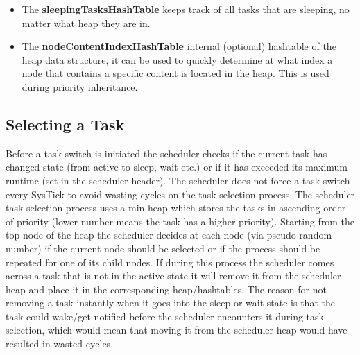 \documentclass[12pt,a4paper]{article}
\begin{document}
\begin{itemize}
  \item The  \textbf{sleepingTasksHashTable} keeps track of all tasks that are sleeping, no matter what heap they are in.
  \item The  \textbf{nodeContentIndexHashTable} internal (optional) hashtable of the heap data structure, it can be used to quickly determine at what index a node that contains a specific content is located in the heap. This is used during priority inheritance.
\end{itemize}




\subsection{Selecting a Task}
Before a task switch is initiated the scheduler checks if the current task has changed state (from active to sleep, wait etc.) or if it has exceeded its maximum runtime (set in the scheduler header). The scheduler does not force a task switch every SysTick to avoid wasting cycles on the task selection process. The scheduler task selection process uses a min heap which stores the tasks in ascending order of priority (lower number means the task has a higher priority). Starting from the top node of the heap the scheduler decides at each node (via pseudo random number) if the current node should be selected or if the process should be repeated for one of its child nodes. If during this process the scheduler comes across a task that is not in the active state it will remove it from the scheduler heap and place it in the corresponding heap/hashtables. The reason for not removing a task instantly when it goes into the sleep or wait state is that the task could wake/get notified before the scheduler encounters it during task selection, which would mean that moving it from the scheduler heap would have resulted in wasted cycles.\\
\end{document}
